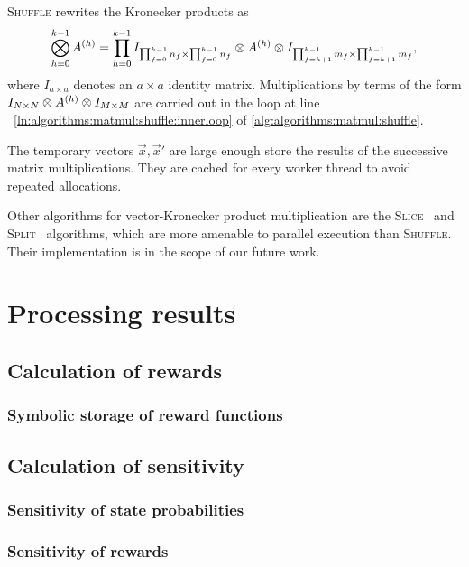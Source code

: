 \begin{itemize}
  \textsc{Shuffle} rewrites the Kronecker products as
  \begin{equation}
    \bigotimes_{h = 0}^{k - 1} A^{(h)} = \prod_{h = 0}^{k - 1}
    I_{\prod_{f = 0}^{h - 1} n_f \times \prod_{f = 0}^{h - 1} n_f} \otimes
    A^{(h)} \otimes I_{\prod_{f = h + 1}^{k - 1} m_f \times
      \prod_{f = h + 1}^{k - 1} m_f} \text,
  \end{equation}
  where $I_{a \times a}$ denotes an $a \times a$ identity matrix.
  Multiplications by terms of the form
  $I_{N \times N} \otimes A^{(h)} \otimes I_{M \times M}$ are
  carried out in the loop at line%
  ~\ref{ln:algorithms:matmul:shuffle:innerloop} of
  \cref{alg:algorithms:matmul:shuffle}.

  The temporary vectors $\vec{x}, \vec{x}'$ are large enough store the
  results of the successive matrix multiplications. They are cached
  for every worker thread to avoid repeated allocations.

  Other algorithms for vector-Kronecker product multiplication are the
  \textsc{Slice}~\citep{fernandes2005alternative} and \textsc{Split}~%
  \citep{DBLP:conf/springsim/CzeksterRFLW10} algorithms, which are
  more amenable to parallel execution than \textsc{Shuffle}. Their
  implementation is in the scope of our future work.
\end{itemize}

\section{Processing results}

\subsection{Calculation of rewards}

\subsubsection{Symbolic storage of reward functions}

\subsection{Calculation of sensitivity}

\subsubsection{Sensitivity of state probabilities}

\subsubsection{Sensitivity of rewards}